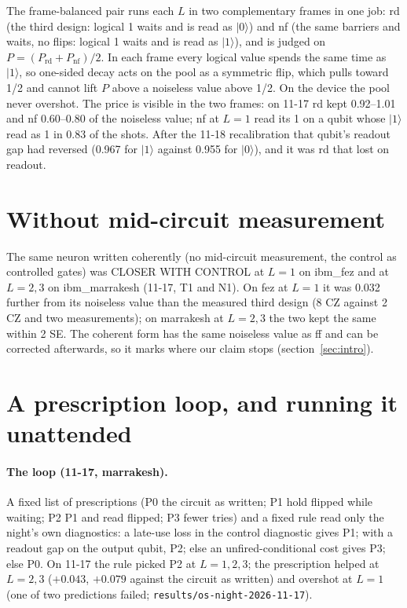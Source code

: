 \documentclass[10pt,a4paper]{article}
\begin{document}
The frame-balanced pair runs each $L$ in two complementary frames in one job: rd (the third design: logical 1 waits and is
read as $|0\rangle$) and nf (the same barriers and waits, no flips: logical 1 waits and is read as $|1\rangle$), and is
judged on $P = (P_\mathrm{rd} + P_\mathrm{nf})/2$. In each frame every logical value spends the same time as $|1\rangle$,
so one-sided decay acts on the pool as a symmetric flip, which pulls toward 1/2 and cannot lift $P$ above a noiseless
value above 1/2. On the device the pool never overshot. The price is visible in the two frames: on 11-17 rd kept
0.92--1.01 and nf 0.60--0.80 of the noiseless value; nf at $L = 1$ read its 1 on a qubit whose $|1\rangle$ read as 1 in
0.83 of the shots. After the 11-18 recalibration that qubit's readout gap had reversed (0.967 for $|1\rangle$ against
0.955 for $|0\rangle$), and it was rd that lost on readout.

\section{Without mid-circuit measurement}\label{sec:coherent}
The same neuron written coherently (no mid-circuit measurement, the control as controlled gates) was CLOSER WITH CONTROL
at $L = 1$ on ibm\_fez and at $L = 2, 3$ on ibm\_marrakesh (11-17, T1 and N1). On fez at $L = 1$ it was 0.032 further from
its noiseless value than the measured third design (8 CZ against 2 CZ and two measurements); on marrakesh at $L = 2, 3$ the
two kept the same within 2 SE. The coherent form has the same noiseless value as ff and can be corrected afterwards, so
it marks where our claim stops (section~\ref{sec:intro}).

\section{A prescription loop, and running it unattended}\label{sec:loop}
\paragraph{The loop (11-17, marrakesh).} A fixed list of prescriptions (P0 the circuit as written; P1 hold flipped while
waiting; P2 P1 and read flipped; P3 fewer tries) and a fixed rule read only the night's own diagnostics: a late-use loss
in the control diagnostic gives P1; with a readout gap on the output qubit, P2; else an unfired-conditional cost gives P3;
else P0. On 11-17 the rule picked P2 at $L = 1, 2, 3$; the prescription helped at $L = 2, 3$ ($+0.043$, $+0.079$ against
the circuit as written) and overshot at $L = 1$ (one of two predictions failed; \texttt{results/os-night-2026-11-17}).
\end{document}
